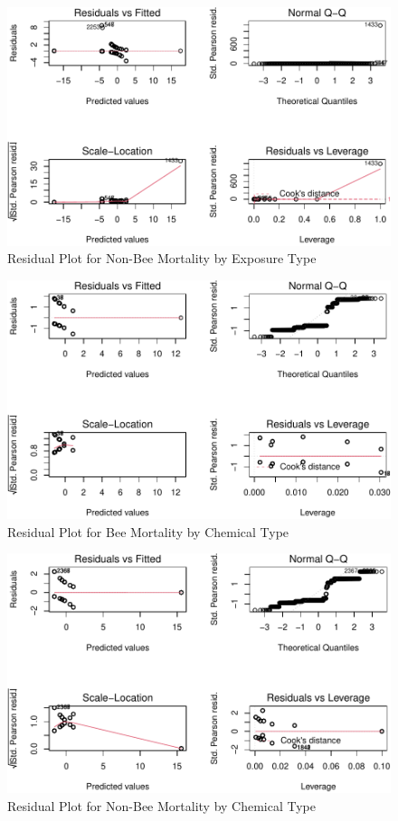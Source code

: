 \documentclass[
  12pt,
]{article}
\begin{document}
\begin{figure}
\centering
\includegraphics{UpdatedwithModel_files/figure-latex/unnamed-chunk-9-1.pdf}
\caption{Residual Plot for Non-Bee Mortality by Exposure Type}
\end{figure}

\newpage

\begin{figure}
\centering
\includegraphics{UpdatedwithModel_files/figure-latex/unnamed-chunk-10-1.pdf}
\caption{Residual Plot for Bee Mortality by Chemical Type}
\end{figure}

\newpage

\begin{figure}
\centering
\includegraphics{UpdatedwithModel_files/figure-latex/unnamed-chunk-11-1.pdf}
\caption{Residual Plot for Non-Bee Mortality by Chemical Type}
\end{figure}
\end{document}
